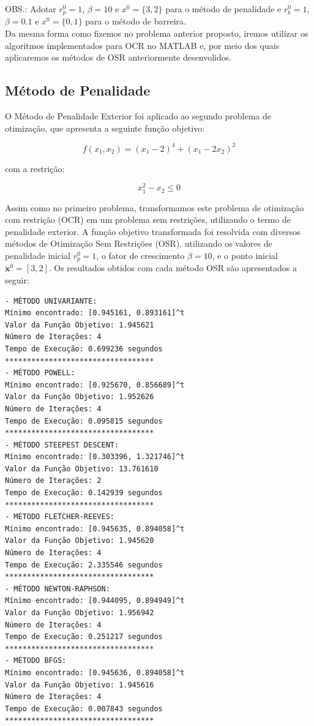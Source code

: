 \documentclass[a4paper, 12pt]{article}
\begin{document}
OBS.: Adotar $r_p ^0=1$, $\beta = 10$ e $x^0 = \{3,2\}$ para o método de penalidade e $r_b ^0=1$, $\beta = 0.1$ e $x^0 = \{0,1\}$ para o método de barreira. \\



Da mesma forma como fizemos no problema anterior proposto, iremos utilizar os algoritmos implementados para OCR no MATLAB e, por meio dos quais aplicaremos os métodos de OSR anteriormente desenvolidos.\\

\subsection{Método de Penalidade}

O Método de Penalidade Exterior foi aplicado ao segundo problema de otimização, que apresenta a seguinte função objetivo:

\begin{equation}
    f(x_1, x_2) = (x_1 - 2)^4 + (x_1 - 2x_2)^2
\end{equation}

com a restrição:

\begin{equation}
    x_1^2 - x_2 \leq 0
\end{equation}

Assim como no primeiro problema, transformamos este problema de otimização com restrição (OCR) em um problema sem restrições, utilizando o termo de penalidade exterior. A função objetivo transformada foi resolvida com diversos métodos de Otimização Sem Restrições (OSR), utilizando os valores de penalidade inicial $r_p^0 = 1$, o fator de crescimento $\beta = 10$, e o ponto inicial $\mathbf{x}^0 = [3, 2]$. Os resultados obtidos com cada método OSR são apresentados a seguir:

\begin{verbatim}
- MÉTODO UNIVARIANTE:
Mínimo encontrado: [0.945161, 0.893161]^t
Valor da Função Objetivo: 1.945621
Número de Iterações: 4
Tempo de Execução: 0.699236 segundos
**********************************
- MÉTODO POWELL:
Mínimo encontrado: [0.925670, 0.856689]^t
Valor da Função Objetivo: 1.952626
Número de Iterações: 4
Tempo de Execução: 0.095815 segundos
**********************************
- MÉTODO STEEPEST DESCENT:
Mínimo encontrado: [0.303396, 1.321746]^t
Valor da Função Objetivo: 13.761610
Número de Iterações: 2
Tempo de Execução: 0.142939 segundos
**********************************
- MÉTODO FLETCHER-REEVES:
Mínimo encontrado: [0.945635, 0.894058]^t
Valor da Função Objetivo: 1.945620
Número de Iterações: 4
Tempo de Execução: 2.335546 segundos
**********************************
- MÉTODO NEWTON-RAPHSON:
Mínimo encontrado: [0.944095, 0.894949]^t
Valor da Função Objetivo: 1.956942
Número de Iterações: 4
Tempo de Execução: 0.251217 segundos
**********************************
- MÉTODO BFGS:
Mínimo encontrado: [0.945636, 0.894058]^t
Valor da Função Objetivo: 1.945616
Número de Iterações: 4
Tempo de Execução: 0.007843 segundos
**********************************
\end{verbatim}
\end{document}
